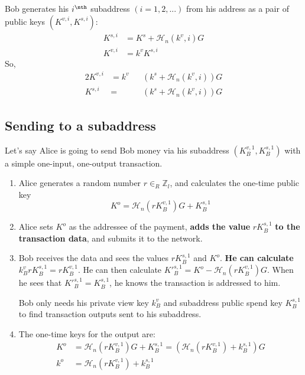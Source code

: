 Bob generates his $i^\nth$ subaddress $(i = 1, 2, ...)$ from his address as a pair of public keys $(K^{v,i}, K^{s,i})$:\vspace{.2cm}
\begin{align*}
    K^{s,i} &= K^s + \mathcal{H}_n(k^v, i) G\\
    K^{v,i} &= k^v K^{s,i}
\end{align*}
\quad So,
\begin{alignat*}{2}
    K^{v,i} &= k^v&&(k^s + \mathcal{H}_n(k^v, i))G\\
    K^{s,i} &= &&(k^s + \mathcal{H}_n(k^v, i))G
\end{alignat*}


\subsection{Sending to a subaddress}

Let's say Alice is going to send Bob money via his subaddress $(K_B^{v,1}, K_B^{s,1})$ with a simple one-input, one-output transaction.
\begin{enumerate}
	\item Alice generates a random number $r \in_R \mathbb{Z}_l$, and calculates the one-time public key\vspace{.2cm}
	\[ K^o  = \mathcal{H}_n(r K_B^{v,1})G + K_B^{s,1} \]

	\item Alice sets $K^o$ as the addressee of the payment, \textbf{adds the value} $r K_B^{s,1}$ \textbf{to the transaction data}, and submits it to the network.

	\item Bob receives the data and sees the values $r K_B^{s,1}$ and $K^o$. \textbf{He can calculate} $k_B^v r K_B^{s,1} = r K_B^{v,1}$. He can then calculate $K'^{s,1}_B = K^o - \mathcal{H}_n(r K_B^{v,1})G$. When he sees that $K'^{s,1}_B = K^{s,1}_B$, he knows the transaction is addressed to him.

	Bob only needs his private view key $k_B^v$ and subaddress public spend key $K^{s,1}_B$ to find transaction outputs sent to his subaddress.

	\item The one-time keys for the output are:\vspace{.2cm}
	\begin{align*}
		K^o &= \mathcal{H}_n(r K_B^{v,1})G + K_B^{s,1} = (\mathcal{H}_n(r K_B^{v,1}) + k_B^{s,1})G  \\
		k^o &= \mathcal{H}_n(r K_B^{v,1}) + k_B^{s,1}
	\end{align*}
\end{enumerate}

